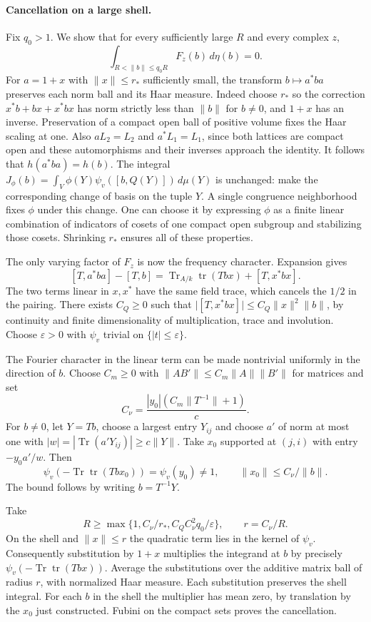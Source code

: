 \paragraph{Cancellation on a large shell.}
Fix \(q_0>1\). We show that for every sufficiently large \(R\) and
every complex \(z\),
\[
          \int_{R<\|b\|\leq q_0R}F_z(b)\,d\eta(b)=0 .
\]
For \(a=1+x\) with \(\|x\|\leq r_*\) sufficiently small, the
transform \(b\mapsto a^*ba\) preserves each norm ball and its Haar
measure. Indeed choose \(r_*\) so the correction
\(x^*b+bx+x^*bx\) has norm strictly less than \(\|b\|\) for \(b\ne0\),
and \(1+x\) has an inverse. Preservation of a compact open ball of
positive volume fixes the Haar scaling at one. Also \(aL_2=L_2\)
and \(a^*L_1=L_1\), since both lattices are compact open and these
automorphisms and their inverses approach the identity. It follows
that \(h(a^*ba)=h(b)\). The integral
\(J_\phi(b)=\int_V\phi(Y)\psi_v([b,Q(Y)])\,d\mu(Y)\) is unchanged:
make the corresponding change of basis on the tuple \(Y\). A single
congruence neighborhood fixes \(\phi\) under this change. One can
choose it by expressing \(\phi\) as a finite linear combination of
indicators of cosets of one compact open subgroup and stabilizing
those cosets. Shrinking \(r_*\) ensures all of these properties.

The only varying factor of \(F_z\) is now the frequency character.
Expansion gives
\[
 [T,a^*ba]-[T,b]
 =\operatorname{Tr}_{A/k}\operatorname{tr}(Tbx)+[T,x^*bx].
\]
The two terms linear in \(x,x^*\) have the same field trace, which
cancels the \(1/2\) in the pairing. There exists \(C_Q\geq0\) such
that \(\lvert[T,x^*bx]\rvert\leq C_Q\|x\|^2\|b\|\), by continuity
and finite dimensionality of multiplication, trace and involution.
Choose \(\varepsilon>0\) with \(\psi_v\) trivial on
\(\{|t|\leq\varepsilon\}\).

The Fourier character in the linear term can be made nontrivial
uniformly in the direction of \(b\). Choose \(C_m\geq0\) with
\(\|AB'\|\leq C_m\|A\|\|B'\|\) for matrices and set
\[
 C_\nu=\frac{|y_0|(C_m\|T^{-1}\|+1)}{c}.
\]
For \(b\ne0\), let \(Y=Tb\), choose a largest entry \(Y_{ij}\) and
choose \(a'\) of norm at most one with
\(\lvert w\rvert=|\operatorname{Tr}(a'Y_{ij})|\geq c\|Y\|\).
Take \(x_0\) supported at \((j,i)\) with entry \(-y_0a'/w\).
Then
\[
 \psi_v(-\operatorname{Tr}\operatorname{tr}(Tbx_0))=\psi_v(y_0)\ne1,
 \qquad \|x_0\|\leq C_\nu/\|b\|.
\]
The bound follows by writing \(b=T^{-1}Y\).

Take
\[
 R\geq\max\{1,C_\nu/r_*, C_Q C_\nu^2 q_0/\varepsilon\},
 \qquad r=C_\nu/R .
\]
On the shell and \(\|x\|\leq r\) the quadratic term lies in the
kernel of \(\psi_v\). Consequently substitution by \(1+x\) multiplies
the integrand at \(b\) by precisely
\(\psi_v(-\operatorname{Tr}\operatorname{tr}(Tbx))\).
Average the substitutions over the additive matrix ball of radius
\(r\), with normalized Haar measure. Each substitution preserves the
shell integral. For each \(b\) in the shell the multiplier has mean
zero, by translation by the \(x_0\) just constructed. Fubini on the
compact sets proves the cancellation.

